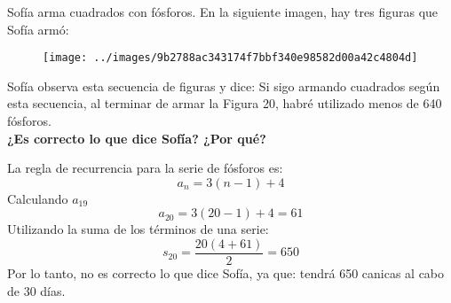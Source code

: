 Sofía arma cuadrados con fósforos. En la siguiente imagen, hay tres figuras que Sofía armó:

\begin{minipage}{0.4\linewidth}
    \begin{figure}[H]
        \centering
        \texttt{[image: ../images/9b2788ac343174f7bbf340e98582d00a42c4804d]}
    \end{figure}
\end{minipage}\hfill
\begin{minipage}{0.6\linewidth}
    Sofía observa esta secuencia de figuras y dice:
    Si sigo armando cuadrados según esta secuencia, al terminar de armar la Figura 20, habré utilizado menos de 640 fósforos.\\
    \textbf{¿Es correcto lo que dice Sofía? ¿Por qué?}\\
\end{minipage}

\begin{solutionbox}{5.5cm}
    La regla de recurrencia para la serie de fósforos es:
    \[a_n=3(n-1)+4\]
    Calculando $a_{19}$
    \[a_{20}=3(20-1)+4=61\]
    Utilizando la suma de los términos de una serie:
    \[s_{20}=\dfrac{20(4+61)}{2}=650\]
    Por lo tanto, no es correcto lo que dice Sofía, ya que: tendrá 650 canicas al cabo de 30 días.
\end{solutionbox}